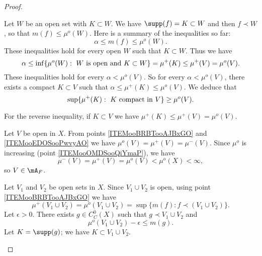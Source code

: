 \begin{proof}
\begin{subproof}
		Let \( W\) be an open set with \( K\subset W\). We have \( \supp(f)=K\subset W\) and then \( f\prec W\), so that $m(f)\leq \mu^o(W)$. Here is a summary of the inequalities so far:
		\begin{equation}
			\alpha\leq m(f)\leq \mu^o(W).
		\end{equation}
		These inequalities hold for every open \( W\) such that \( K\subset W\). Thus we have
		\begin{equation}
			\alpha\leq \inf\{ \mu^o(W):\text{ \( W\) is open and \( K\subset W\)} \} =\mu^+(K) \leq \mu^+(V)= \mu^o(V).
		\end{equation}
		These inequalities hold for every \( \alpha<\mu^o(V)\). So for every \( \alpha<\mu^o(V)\), there exists a compact \( K\subset V\) such that \( \alpha\leq \mu^+(K)\leq \mu^o(V)\). We deduce that
		\begin{equation}
			\sup\{ \mu^+(K):\text{ \( K\) compact in \( V\)} \}\geq \mu^o(V).
		\end{equation}

		For the reverse inequality, if \( K\subset V\) we have \( \mu^+(K)\leq \mu^+(V)=\mu^o(V)\).

		Let \( V\) be open in \( X\). From points \ref{ITEMooBRBTooAJBxGO} and \ref{ITEMooEDOSooPwvyAO} we have \( \mu^o(V)=\mu^+(V)=\mu^-(V)\). Since \( \mu^o\) is increasing (point \ref{ITEMooOMDSooQiYmaP}), we have
		\begin{equation}
			\mu^-(V)=\mu^+(V)=\mu^o(V)<\mu^o(X)<\infty,
		\end{equation}
		so \( V\in\mA_F\).

		        \label{ITEMooLPYWooONCYTi}
		Let \( V_1\) and \( V_2\) be open sets in \( X\). Since \( V_1\cup V_2\) is open, using point \ref{ITEMooBRBTooAJBxGO} we have
		\begin{equation}
			\mu^+(V_1\cup V_2)=\mu^o(V_1\cup V_2)=\sup\{ m(f):f\prec (V_1\cup V_2) \}.
		\end{equation}
		Let \( \epsilon>0\). There exists \( g\in C^0_C(X)\) such that \( g\prec V_1\cup V_2\) and
		\begin{equation}        \label{LEMooFYAAooDaOYUy}
			\mu^o(V_1\cup V_2)-\epsilon\leq m(g).
		\end{equation}
		Let \( K=\supp(g)\); we have \( K\subset V_1\cup V_2\).


\end{subproof}
\end{proof}
